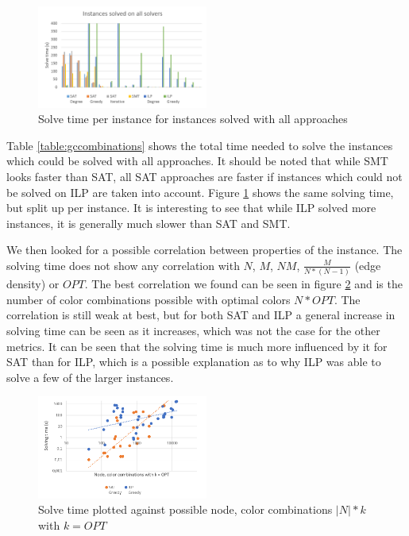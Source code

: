 \documentclass{sig-alternate}
\begin{document}
\begin{figure}
  \includegraphics[width=0.5\textwidth]{figures/solve_time_comparison}
  \caption{Solve time per instance for instances solved with all approaches}
  \label{fig:solvetimecomparison}
\end{figure}

Table \ref{table:gccombinations} shows the total time needed to solve the instances which could be solved with all approaches.
It should be noted that while SMT looks faster than SAT, all SAT approaches are faster if instances which could not be solved on ILP are taken into account.
Figure \ref{fig:solvetimecomparison} shows the same solving time, but split up per instance.
It is interesting to see that while ILP solved more instances, it is generally much slower than SAT and SMT.

We then looked for a possible correlation between properties of the instance.
The solving time does not show any correlation with $N$, $M$, $N M$, $\frac{M}{N*(N-1)}$ (edge density) or $OPT$.
The best correlation we found can be seen in figure \ref{fig:nodecolorcombinations} and is the number of color combinations possible with optimal colors $N * OPT$.
The correlation is still weak at best, but for both SAT and ILP a general increase in solving time can be seen as it increases, which was not the case for the other metrics.
It can be seen that the solving time is much more influenced by it for SAT than for ILP, which is a possible explanation as to why ILP was able to solve a few of the larger instances.




\begin{figure}
  \includegraphics[width=0.5\textwidth]{figures/nodecolor_combinations_in_opt}
  \caption{Solve time plotted against possible node, color combinations $|N|*k$ with $k=OPT$}
  \label{fig:nodecolorcombinations}
\end{figure}
\end{document}
